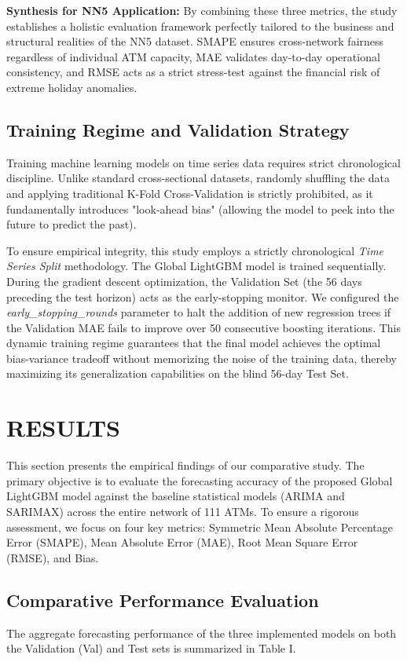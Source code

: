 \documentclass[conference, 12pt, onecolumn]{IEEEtran}
\begin{document}
\textbf{Synthesis for NN5 Application:} 
By combining these three metrics, the study establishes a holistic evaluation framework perfectly tailored to the business and structural realities of the NN5 dataset. SMAPE ensures cross-network fairness regardless of individual ATM capacity, MAE validates day-to-day operational consistency, and RMSE acts as a strict stress-test against the financial risk of extreme holiday anomalies.

\subsection{Training Regime and Validation Strategy}
Training machine learning models on time series data requires strict chronological discipline. Unlike standard cross-sectional datasets, randomly shuffling the data and applying traditional K-Fold Cross-Validation is strictly prohibited, as it fundamentally introduces "look-ahead bias" (allowing the model to peek into the future to predict the past). 

To ensure empirical integrity, this study employs a strictly chronological \textit{Time Series Split} methodology. The Global LightGBM model is trained sequentially. During the gradient descent optimization, the Validation Set (the 56 days preceding the test horizon) acts as the early-stopping monitor. We configured the \textit{early\_stopping\_rounds} parameter to halt the addition of new regression trees if the Validation MAE fails to improve over 50 consecutive boosting iterations. This dynamic training regime guarantees that the final model achieves the optimal bias-variance tradeoff without memorizing the noise of the training data, thereby maximizing its generalization capabilities on the blind 56-day Test Set.

\section{RESULTS}
This section presents the empirical findings of our comparative study. The primary objective is to evaluate the forecasting accuracy of the proposed Global LightGBM model against the baseline statistical models (ARIMA and SARIMAX) across the entire network of 111 ATMs. To ensure a rigorous assessment, we focus on four key metrics: Symmetric Mean Absolute Percentage Error (SMAPE), Mean Absolute Error (MAE), Root Mean Square Error (RMSE), and Bias.

\subsection{Comparative Performance Evaluation}
The aggregate forecasting performance of the three implemented models on both the Validation (Val) and Test sets is summarized in Table I.
\end{document}

